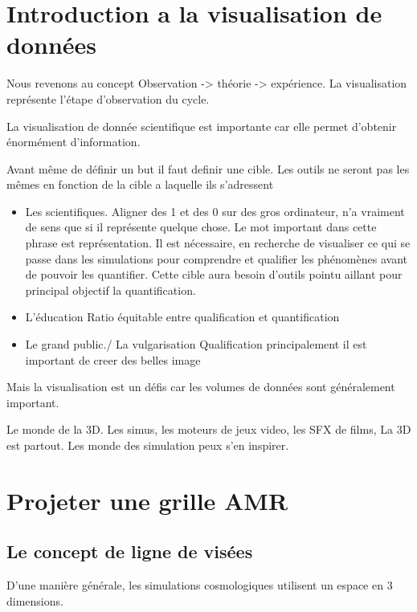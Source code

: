 \section{Introduction a la visualisation de données}

 
Nous revenons au concept Observation -> théorie -> expérience.
La visualisation représente l'étape d'observation du cycle.

La visualisation de donnée scientifique est importante car elle permet d'obtenir énormément d'information.

Avant même de définir un but il faut definir une cible.
Les outils ne seront pas les mêmes en fonction de la cible a laquelle ils s'adressent


\begin{itemize}
\item Les scientifiques.
Aligner des 1 et des 0 sur des gros ordinateur, n'a vraiment de sens que si il représente quelque chose.
Le mot important dans cette phrase est représentation.
Il est nécessaire, en recherche de visualiser ce qui se passe dans les simulations pour comprendre et qualifier les phénomènes avant de pouvoir les quantifier.
Cette cible aura besoin d'outils pointu aillant pour principal objectif la quantification.

\item L'éducation 
Ratio équitable entre qualification et quantification

\item Le grand public./ La vulgarisation
Qualification principalement 
il est important de creer des belles image
\end{itemize}

Mais la visualisation est un défis car les volumes de données sont généralement important.



Le monde de la 3D.
Les simus, les moteurs de jeux video, les SFX de films,
La 3D est partout.
Les monde des simulation peux s'en inspirer.


\section{Projeter une grille AMR}

\subsection{Le concept de ligne de visées}

D'une manière générale, les simulations cosmologiques utilisent un espace en 3 dimensions.

